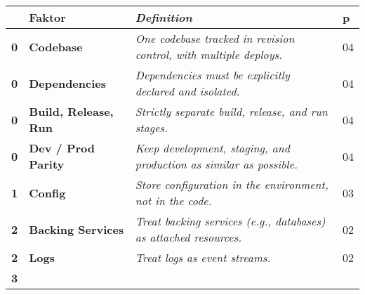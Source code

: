 \setcounter{factorno}{-1}
\begin{longtable}{  |   >{\raggedleft\bfseries}p{}              %
                    |   >{\raggedright\bfseries\small}p{}       %
                    |   >{\raggedright\itshape\small}p{}        %
                    |   >{}p{}                                  %
                    | }
    \hline
          \upshape\normalsize
        & \upshape\normalsize\textbf{Faktor} 
        & \upshape\normalsize\textbf{Definition} \cite{101:The-Twelve-Factor-App}
        & \upshape\normalsize\textbf{\acrshort{p}} \\
    \hline \hline
    \endhead
    \hline
          0
        & %
          Codebase
        & One codebase tracked in revision control, with multiple deploys.
        & 04 \\
    \hline
          0
        & %
          Dependencies
        & Dependencies must be explicitly declared and isolated.
        & 04 \\
    \hline
          0
        & %
          Build, Release, Run
        & Strictly separate build, release, and run stages.
        & 04 \\
    \hline
          0
        & %
          Dev / Prod Parity
        & Keep development, staging, and production as similar as possible.
        & 04 \\
    \hline
          1
        & %
          Config
        & Store configuration in the environment, not in the code.
        & 03 \\
    \hline
          2
        & %
          Backing Services
        & Treat backing services (e.g., databases) as attached resources.
        & 02 \\
    \hline
          2
        & %
          Logs
        & Treat logs as event streams.
        & 02 \\
    \hline
          3
        & %

\end{longtable}
